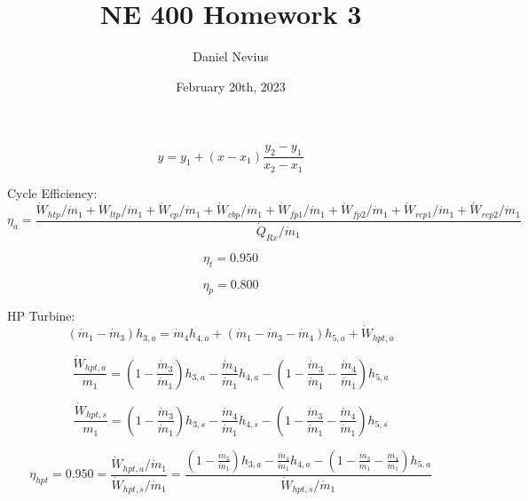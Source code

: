 \documentclass{article}
\title{NE 400 Homework 3}
\author{Daniel Nevius}
\date{February 20th, 2023}
\begin{document}
\maketitle

\section{}

\begin{equation}\label{interpolation}
y = y_1 + (x - x_1) \frac{y_2 - y_1}{x_2 - x_1}
\end{equation}


Cycle Efficiency:
\begin{equation}
\eta_{a} = \frac{\dot{W}_{htp    } / \dot{m}_{1} + \dot{W}_{ltp    } / \dot{m}_{1} + \dot{W}_{cp     } / \dot{m}_{1} + \dot{W}_{cbp    } / \dot{m}_{1} + \dot{W}_{fp1    } / \dot{m}_{1} + \dot{W}_{fp2    } / \dot{m}_{1} + \dot{W}_{rcp1   } / \dot{m}_{1} + \dot{W}_{rcp2   } / \dot{m}_{1}}{\dot{Q}_{Rx     } / \dot{m}_{1}}
\end{equation}

\begin{equation}
\eta_{t} =    0.950
\end{equation}

\begin{equation}
\eta_{p} =    0.800
\end{equation}


HP Turbine:
\begin{equation}
(\dot{m}_{ 1} - \dot{m}_{ 3})h_{ 3,a} = \dot{m}_{ 4}h_{ 4,a} + (\dot{m}_{ 1} - \dot{m}_{ 3} - \dot{m}_{ 4})h_{ 5,a} + \dot{W}_{hpt,a}
\end{equation}

\begin{equation}
\frac{\dot{W}_{hpt,a}}{m_1} = (1 - \frac{\dot{m}_{ 3}}{\dot{m}_{ 1}})h_{ 3,a} - \frac{\dot{m}_{ 4}}{\dot{m}_{ 1}}h_{ 4,a} - (1 - \frac{\dot{m}_{ 3}}{\dot{m}_{ 1}} - \frac{\dot{m}_{ 4}}{\dot{m}_{ 1}})h_{ 5,a}\end{equation}

\begin{equation}
\frac{\dot{W}_{hpt,s}}{m_1} = (1 - \frac{\dot{m}_{ 3}}{\dot{m}_{ 1}})h_{ 3,s} - \frac{\dot{m}_{ 4}}{\dot{m}_{ 1}}h_{ 4,s} - (1 - \frac{\dot{m}_{ 3}}{\dot{m}_{ 1}} - \frac{\dot{m}_{ 4}}{\dot{m}_{ 1}})h_{ 5,s}\end{equation}

\begin{equation}
\eta_{hpt} =    0.950 = \frac{\dot{W}_{hpt,a} / \dot{m}_{1}}{\dot{W}_{hpt,s} / \dot{m}_{1}} = \frac{
(1 - \frac{\dot{m}_{ 3}}{\dot{m}_{ 1}})h_{ 3,a} - \frac{\dot{m}_{ 4}}{\dot{m}_{ 1}}h_{ 4,a} - (1 - \frac{\dot{m}_{ 3}}{\dot{m}_{ 1}} - \frac{\dot{m}_{ 4}}{\dot{m}_{ 1}})h_{ 5,a}}{\dot{W}_{hpt,s} / \dot{m}_{1}}
\end{equation}
\end{document}
